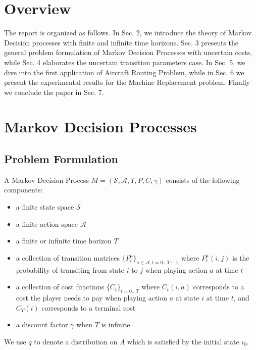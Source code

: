 \documentclass[11pt,reqno]{amsart}
\theoremstyle{definition}
\numberwithin{equation}{section}
\theoremstyle{remark}
\begin{document}
\vspace{20pt}

\section{Overview}
The report is organized as follows. In Sec. 2, we introduce the theory of Markov Decision processes with finite and infinite time horizons.
Sec. 3 presents the general problem formulation of Markov Decision Processes with uncertain costs, while Sec. 4 elaborates the uncertain transition parameters case. In Sec. 5, we dive into the first application of Aircraft Routing Problem, while in Sec. 6 we present the experimental results for the Machine Replacement problem. Finally we conclude the paper in Sec. 7.

\medskip

\section{Markov Decision Processes}


\subsection{Problem Formulation}
A Markov Decision Process $M = (\mathcal{S}, \mathcal{A}, T, P, C, \gamma)$ consists of the following components: 
\begin{itemize}
    \item a finite state space $\mathcal{S}$
    \item a finite action space $\mathcal{A}$
    \item a finite or infinite time horizon $T$
    \item a collection of transition matrices $\{P^a_t\}_{a\in\mathcal{A},t=0\ldots T-1}$ where $P^a_t(i,j)$ is the probability of transiting from state $i$ to $j$ when playing action $a$ at time $t$
    \item a collection of cost functions $\{C_t\}_{t=0\ldots T}$ where $C_t(i, a)$ corresponds to a cost the player needs to pay when playing action $a$ at state $i$ at time $t$, and $C_T(i)$ corresponds to a terminal cost
    \item a discount factor $\gamma$ when $T$ is infinite
\end{itemize}
We use $q$ to denote a distribution on $A$ which is satisfied by the initial state $i_0$.
\end{document}
